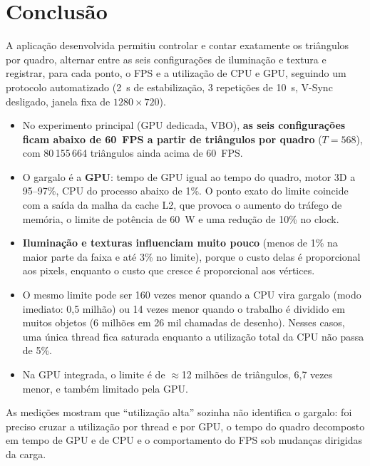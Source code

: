 \documentclass[12pt,a4paper]{article}
\begin{document}
\section{Conclusão}

A aplicação desenvolvida permitiu controlar e contar exatamente os triângulos por quadro,
alternar entre as seis configurações de iluminação e textura e registrar, para cada ponto, o FPS
e a utilização de CPU e GPU, seguindo um protocolo automatizado (2~s de estabilização, 3
repetições de 10~s, V-Sync desligado, janela fixa de $1280\times720$).

\begin{itemize}
  \item No experimento principal (GPU dedicada, VBO), \textbf{as seis configurações ficam abaixo
        de 60~FPS a partir de \limVboA{} triângulos por quadro} ($T=568$), com 80\,155\,664
        triângulos ainda acima de 60~FPS.
  \item O gargalo é a \textbf{GPU}: tempo de GPU igual ao tempo do quadro, motor 3D a 95--97\%,
        CPU do processo abaixo de 1\%. O ponto exato do limite coincide com a saída da malha da
        cache L2, que provoca o aumento do tráfego de memória, o limite de potência de 60~W e uma
        redução de 10\% no clock.
  \item \textbf{Iluminação e texturas influenciam muito pouco} (menos de 1\% na maior parte da
        faixa e até 3\% no limite), porque o custo delas é proporcional aos pixels, enquanto o
        custo que cresce é proporcional aos vértices.
  \item O mesmo limite pode ser 160 vezes menor quando a CPU vira gargalo (modo imediato:
        0,5 milhão) ou 14 vezes menor quando o trabalho é dividido em muitos objetos (6 milhões em
        26 mil chamadas de desenho). Nesses casos, uma única thread fica saturada enquanto a
        utilização total da CPU não passa de 5\%.
  \item Na GPU integrada, o limite é de $\approx$12 milhões de triângulos, 6,7 vezes menor, e
        também limitado pela GPU.
\end{itemize}
As medições mostram que ``utilização alta'' sozinha não identifica o gargalo: foi preciso cruzar
a utilização por thread e por GPU, o tempo do quadro decomposto em tempo de GPU e de CPU e o
comportamento do FPS sob mudanças dirigidas da carga.
\end{document}
